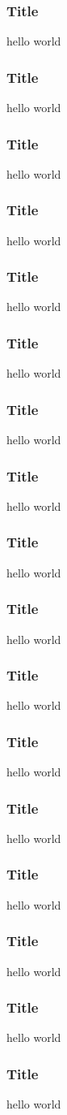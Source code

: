 \documentclass[12pt,letterpaper]{beamer}
\begin{document}
\begin{frame}
\frametitle{Title}
hello world
\end{frame}

\begin{frame}
\frametitle{Title}
hello world
\end{frame}

\begin{frame}
\frametitle{Title}
hello world
\end{frame}

\begin{frame}
\frametitle{Title}
hello world
\end{frame}

\begin{frame}
\frametitle{Title}
hello world
\end{frame}

\begin{frame}
\frametitle{Title}
hello world
\end{frame}

\begin{frame}
\frametitle{Title}
hello world
\end{frame}

\begin{frame}
\frametitle{Title}
hello world
\end{frame}

\begin{frame}
\frametitle{Title}
hello world
\end{frame}

\begin{frame}
\frametitle{Title}
hello world
\end{frame}

\begin{frame}
\frametitle{Title}
hello world
\end{frame}

\begin{frame}
\frametitle{Title}
hello world
\end{frame}

\begin{frame}
\frametitle{Title}
hello world
\end{frame}

\begin{frame}
\frametitle{Title}
hello world
\end{frame}

\begin{frame}
\frametitle{Title}
hello world
\end{frame}

\begin{frame}
\frametitle{Title}
hello world
\end{frame}

\begin{frame}
\frametitle{Title}
hello world
\end{frame}

%
%
\end{document}
